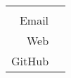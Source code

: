 \begin{center}
	\begin{tabular}{rl}
	& {\LARGE\name} \\[10pt]
	{\color{lightgray}Email} & \myurl{\myemail} \\
	{\color{lightgray}Web} & \href{\mywebpageURL}{\mywebpageLABEL} \\
	{\color{lightgray}GitHub} & \href{\mygithubURL}{\mygithubLABEL}
	\end{tabular}
\end{center}

